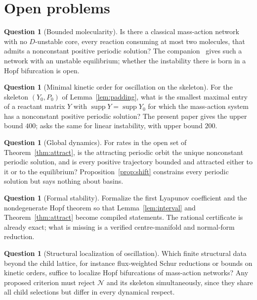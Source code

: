 \documentclass[11pt,a4paper]{article}
\theoremstyle{plain}
\theoremstyle{definition}
\newtheorem{question}[theorem]{Question}
\theoremstyle{remark}
\newcommand{\supp}{\operatorname{supp}}
\newcommand{\Osc}{\mathcal{N}}
\begin{document}
\section{Open problems}\label{sec:open}

\begin{question}[Bounded molecularity]
Is there a classical mass-action network with no $D$-unstable core, every reaction consuming at most two molecules, that admits a nonconstant positive periodic solution? The companion~\cite{ReactantBimolecular2026} gives such a network with an unstable equilibrium; whether the instability there is born in a Hopf bifurcation is open.
\end{question}

\begin{question}[Minimal kinetic order for oscillation on the skeleton]
For the skeleton $(Y_0,P_0)$ of Lemma~\ref{lem:padding}, what is the smallest maximal entry of a reactant matrix $Y$ with $\supp Y=\supp Y_0$ for which the mass-action system has a nonconstant positive periodic solution? The present paper gives the upper bound $400$; \cite[Question~8.2]{KineticOrder2026} asks the same for linear instability, with upper bound $200$.
\end{question}

\begin{question}[Global dynamics]
For rates in the open set of Theorem~\ref{thm:attract}, is the attracting periodic orbit the unique nonconstant periodic solution, and is every positive trajectory bounded and attracted either to it or to the equilibrium? Proposition~\ref{prop:shift} constrains every periodic solution but says nothing about basins.
\end{question}

\begin{question}[Formal stability]
Formalize the first Lyapunov coefficient and the nondegenerate Hopf theorem so that Lemma~\ref{lem:interval} and Theorem~\ref{thm:attract} become compiled statements. The rational certificate is already exact; what is missing is a verified centre-manifold and normal-form reduction.
\end{question}

\begin{question}[Structural localization of oscillation]
Which finite structural data beyond the child lattice, for instance flux-weighted Schur reductions or bounds on kinetic orders, suffice to localize Hopf bifurcations of mass-action networks? Any proposed criterion must reject $\Osc$ and its skeleton simultaneously, since they share all child selections but differ in every dynamical respect.
\end{question}



\end{document}

